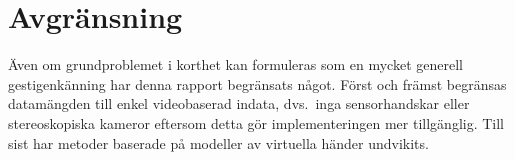 \documentclass[../rapport_MVEX01-11-05]{subfiles}
\begin{document}
\section{Avgränsning}

Även om grundproblemet i korthet kan formuleras som en mycket generell
gestigenkänning har denna rapport begränsats något. Först och främst
begränsas datamängden till enkel videobaserad indata, dvs.~inga sensorhandskar
eller stereoskopiska kameror eftersom detta gör implementeringen mer
tillgänglig. Till sist har metoder baserade på modeller av virtuella händer
undvikits.

\end{document}
